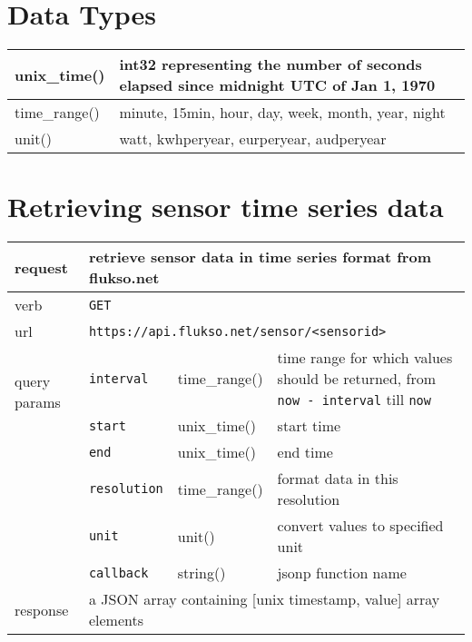 \section{Data Types}
\begin{tabular}{|l|p{9.5cm}|}

\hline
unix\_time() & int32 representing the number of seconds elapsed since midnight UTC of Jan 1, 1970 \\

\hline
time\_range() & minute, 15min, hour, day, week, month, year, night \\

\hline
unit() & watt, kwhperyear, eurperyear, audperyear \\

\hline

\end{tabular}

\section{Retrieving sensor time series data}
\begin{tabular}{|l|l|l|p{5cm}|}

\hline
request & \multicolumn{3}{|l|}{retrieve sensor data in time series format from flukso.net} \\

\hline
verb & \multicolumn{3}{|l|}{\texttt{GET}} \\

\hline
url & \multicolumn{3}{|l|}{\texttt{https://api.flukso.net/sensor/\textless sensorid\textgreater}} \\

\hline
\multirow{2}{*}{query params} & \texttt{interval} & time\_range() & time range for which values should be returned, from \texttt{now - interval} till \texttt{now} \\
& \texttt{start} & unix\_time() & start time \\
& \texttt{end} & unix\_time() & end time \\
& \texttt{resolution} & time\_range() & format data in this resolution \\
& \texttt{unit} & unit() & convert values to specified unit \\
& \texttt{{\small callback}} & string() & jsonp function name \\

\hline
response & \multicolumn{3}{|l|}{a JSON array containing [unix timestamp, value] array elements} \\

\hline

\end{tabular}

